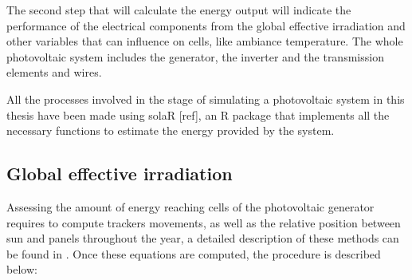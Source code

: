 The second step that will calculate the energy output will indicate the performance of the electrical components from the global effective irradiation and other variables that can influence on cells, like ambiance temperature. The whole photovoltaic system includes the generator, the inverter and the transmission elements and wires.



All the processes involved in the stage of simulating a photovoltaic system in this thesis have been made using solaR [ref], an R package that implements all the necessary functions to estimate the energy provided by the system.

\subsection{Global effective irradiation}

Assessing the amount of energy reaching cells of the photovoltaic generator requires to compute trackers movements, as well as the relative position between sun and panels throughout the year, a detailed description of these methods can be found in \citep{Perpinan.Marcos.ea2013}.  Once these equations are computed, the procedure is described below:\\


